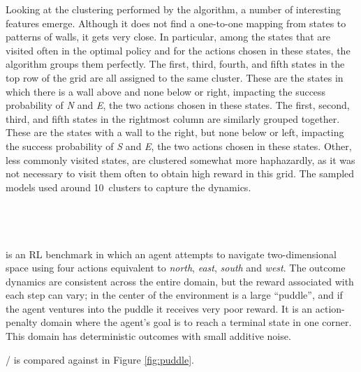 Looking at the clustering performed by the algorithm, a number of
interesting features emerge.  Although it does not find a one-to-one
mapping from states to patterns of walls, it gets very close.  In
particular, among the states that are visited often in the optimal
policy and for the actions chosen in these states, the algorithm
groups them perfectly.  The first, third, fourth, and fifth states in
the top row of the grid are all assigned to the same cluster.  These
are the states in which there is a wall above and none below or right,
impacting the success probability of \emph{N} and \emph{E}, the two actions
chosen in these states.  The first, second, third, and fifth states in
the rightmost column are similarly grouped together.  These are the
states with a wall to the right, but none below or left, impacting the
success probability of \emph{S} and \emph{E}, the two actions chosen in these
states.  Other, less commonly visited states, are clustered somewhat
more haphazardly,
as it was not necessary to visit them often to
obtain high reward in this grid.  The sampled models used around
10~clusters to capture the dynamics.

\subsection{~\cite{boyan94b}}
\label{puddle}

 is an RL benchmark in which an agent attempts to navigate two-dimensional space using four actions equivalent to \emph{north}, \emph{east}, \emph{south} and \emph{west}. The outcome dynamics are consistent across the entire domain, but the reward associated with each step can vary; in the center of the environment is a large ``puddle'', and if the agent ventures into the puddle it receives very poor reward. It is an action-penalty domain where the agent's goal is to reach a terminal state in one corner. This domain has deterministic outcomes with small additive noise.

/ is compared against  in Figure \ref{fig:puddle}.

